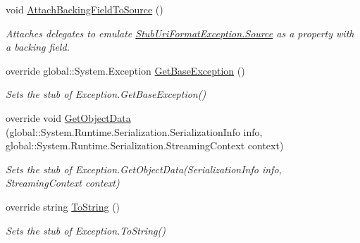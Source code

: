 \begin{DoxyCompactItemize}
void \hyperlink{class_system_1_1_fakes_1_1_stub_uri_format_exception_a069361e3f7b45d74ebd417d06ef27da8}{Attach\-Backing\-Field\-To\-Source} ()
\begin{DoxyCompactList}\small\item\em Attaches delegates to emulate \hyperlink{class_system_1_1_fakes_1_1_stub_uri_format_exception_ae3d7b31ce7b5a7336d32fa193f94fc8e}{Stub\-Uri\-Format\-Exception.\-Source} as a property with a backing field.\end{DoxyCompactList}\item 
override global\-::\-System.\-Exception \hyperlink{class_system_1_1_fakes_1_1_stub_uri_format_exception_a53241514043f5ed3882b55229ea97180}{Get\-Base\-Exception} ()
\begin{DoxyCompactList}\small\item\em Sets the stub of Exception.\-Get\-Base\-Exception()\end{DoxyCompactList}\item 
override void \hyperlink{class_system_1_1_fakes_1_1_stub_uri_format_exception_a7f1559234afdeca04203a3fcacce4688}{Get\-Object\-Data} (global\-::\-System.\-Runtime.\-Serialization.\-Serialization\-Info info, global\-::\-System.\-Runtime.\-Serialization.\-Streaming\-Context context)
\begin{DoxyCompactList}\small\item\em Sets the stub of Exception.\-Get\-Object\-Data(\-Serialization\-Info info, Streaming\-Context context)\end{DoxyCompactList}\item 
override string \hyperlink{class_system_1_1_fakes_1_1_stub_uri_format_exception_ac782845083ff072e0e71010040d1518c}{To\-String} ()
\begin{DoxyCompactList}\small\item\em Sets the stub of Exception.\-To\-String()\end{DoxyCompactList}\end{DoxyCompactItemize}

